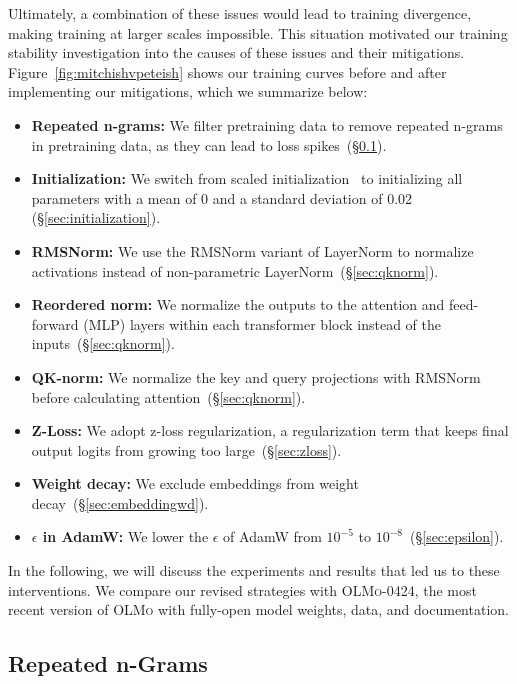 \documentclass[table]{ai2style/ai2}
\newcommand{\olmo}{\textsc{OLMo}\xspace}
\newcommand{\olmoapril}{\textsc{OLMo-0424}\xspace}
\begin{document}
Ultimately, a combination of these issues would lead to training divergence, making training at larger scales impossible.
This situation motivated our training stability investigation into the causes of these issues and their mitigations.
Figure~\ref{fig:mitchishvpeteish} shows our training curves before and after implementing our mitigations, which we summarize below:\nopagebreak  
\begin{itemize}
    \item  \textbf{Repeated n-grams:} We filter pretraining data to remove repeated n-grams in pretraining data, as they can lead to loss spikes~(\S\ref{sec:datafilter}).
    \item \textbf{Initialization:} We switch from scaled initialization~\citep{Zhang2019ImprovingDT} to initializing all parameters with a mean of 0 and a standard deviation of 0.02 (\S\ref{sec:initialization}).
    \item \textbf{RMSNorm:} We use the RMSNorm variant of LayerNorm to normalize activations instead of non-parametric LayerNorm~(\S\ref{sec:qknorm}).
    \item \textbf{Reordered norm:} We normalize the outputs to the attention and feed-forward (MLP) layers within each transformer block instead of the inputs~(\S\ref{sec:qknorm}).
    \item \textbf{QK-norm:} We normalize the key and query projections with RMSNorm before calculating attention~(\S\ref{sec:qknorm}).
    \item \textbf{Z-Loss:} We adopt z-loss regularization, a regularization term that keeps final output logits from growing too large~(\S\ref{sec:zloss}).
    \item \textbf{Weight decay:} We exclude embeddings from weight decay~(\S\ref{sec:embeddingwd}).
    \item \textbf{$\epsilon$ in AdamW:} We lower the $\epsilon$ of AdamW from $10^{-5}$ to $10^{-8}$~(\S\ref{sec:epsilon}).
\end{itemize}

In the following, we will discuss the experiments and results that led us to these interventions.  
We compare our revised strategies with \olmoapril, the most recent version of \olmo with fully-open model weights, data, and documentation.

\subsection{Repeated n-Grams}
\label{sec:datafilter}
\end{document}
